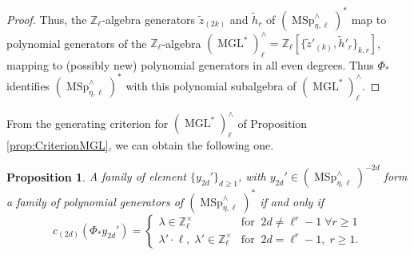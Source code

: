 \documentclass[10pt]{amsart}
\theoremstyle{definition}
\theoremstyle{plain}
\newtheorem{prop}[defn]{Proposition}
\numberwithin{equation}{section}
\newcommand{\0}{\emptyset}
\newcommand{\Z}{{\mathbb Z}}
\newcommand{\MGL}{{\operatorname{MGL}}}
\newcommand{\MSp}{{\operatorname{MSp}}}
\begin{document}
\begin{proof}
Thus, the $\Z_\ell$-algebra generators $\tilde{z}_{(2k)}$ and $\tilde{h}_r$ of $(\MSp_{\eta, \ell}^\wedge)^*$ map to polynomial generators of the $\Z_\ell$-algebra $(\MGL^*)_\ell^\wedge=\Z_\ell[\{\tilde{z}'_{(k)}, \tilde{h}'_r\}_{k,r}]$, mapping to (possibly new) polynomial generators in all even degrees. Thus $\Phi_*$ identifies $(\MSp_{\eta, \ell}^\wedge)^*$ with this polynomial subalgebra of $(\MGL^*)_\ell^\wedge$.
\end{proof}

From the generating criterion for $(\MGL^*)^\wedge_\ell$ of Proposition \ref{prop:CriterionMGL}, we can obtain the following one.

\begin{prop}
\label{prop:CriterionMSp}
    A family of element $\{y_{2d}'\}_{d \ge 1}$, with $y_{2d}' \in (\MSp^\wedge_{\eta,\ell})^{-2d}$ form a family of polynomial generators of $(\MSp_{\eta,\ell}^\wedge)^*$ if and only if
    \begin{equation*}
        c_{(2d)}(\Phi_* y_{2d}')=
        \begin{cases}
            \lambda \in \Z_\ell^\times & \text{for} \; \; 2d \neq \ell^r-1 \; \forall r \ge 1 \\
            \lambda' \cdot \ell, \; \lambda' \in \Z_\ell^\times & \text{for} \; \; 2d= \ell^r-1, \; r\ge 1.
        \end{cases}
    \end{equation*}
\end{prop}
\end{document}
